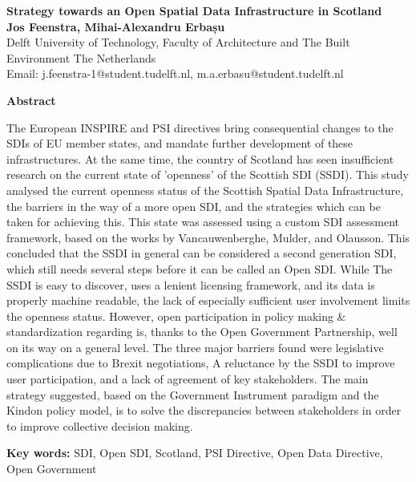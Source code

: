 \documentclass[12pt]{article}
\begin{document}
\begin{center}
 \large \textbf{Strategy towards an Open Spatial Data Infrastructure in Scotland}\\
\vspace{0.8cm} 
 \normalsize \textbf{Jos Feenstra, Mihai-Alexandru Erbașu}\\
 Delft University of Technology, Faculty of Architecture and The Built Environment
 The Netherlands\\
 Email: {j.feenstra-1@student.tudelft.nl, m.a.erbasu@student.tudelft.nl}
\end{center}


\begin{flushleft}\textbf{Abstract} 

The European INSPIRE and PSI directives bring consequential changes to the SDIs of EU member states, and mandate further development of these infrastructures. At the same time, the country of Scotland has seen insufficient research on the current state of 'openness' of the Scottish SDI (SSDI). This study analysed the current openness status of the Scottish Spatial Data Infrastructure, the barriers in the way of a more open SDI, and the strategies which can be taken for achieving this. This state was assessed using a custom SDI assessment framework, based on the works by Vancauwenberghe, Mulder, and Olausson. This concluded that the SSDI in general can be considered a second generation SDI, which still needs several steps before it can be called an Open SDI. While The SSDI is easy to discover, uses a lenient licensing framework, and its data is properly machine readable, the lack of especially sufficient user involvement limits the openness status. However, open participation in policy making \& standardization regarding is, thanks to the Open Government Partnership, well on its way on a general level. The three major barriers found were legislative complications due to Brexit negotiations, A reluctance by the SSDI to improve user participation, and a lack of agreement of key stakeholders. The main strategy suggested, based on the Government Instrument paradigm and the Kindon policy model, is to solve the discrepancies between stakeholders in order to improve collective decision making.

\end{flushleft}
\begin{flushleft}
\textbf{Key words: } SDI, Open SDI, Scotland, PSI Directive, Open Data Directive, Open Government
\end{flushleft}

\newpage


\newpage


\newpage


\newpage


\newpage


\newpage


\newpage


\end{document}
